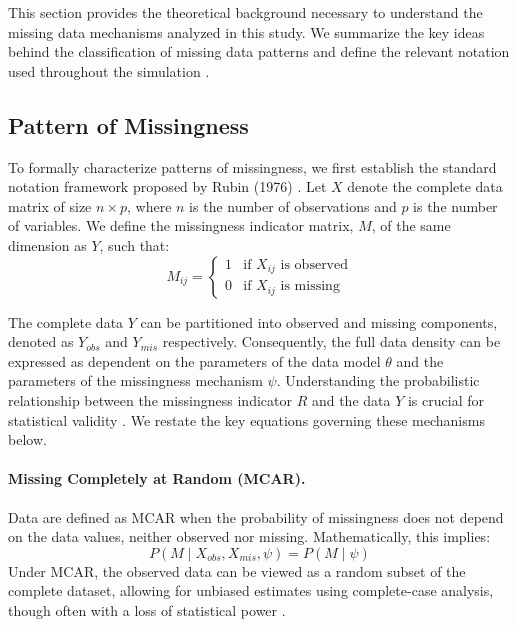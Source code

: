 \documentclass[11pt, a4paper]{article}
\begin{document}
This section provides the theoretical background necessary to understand the missing data mechanisms analyzed in this study.
We summarize the key ideas behind the classification of missing data patterns and define the relevant notation used throughout the simulation \citep{LittleRubin2019}.

\subsection{Pattern of Missingness}
To formally characterize patterns of missingness, we first establish the standard notation framework proposed by Rubin (1976) \citep{LittleRubin2019}.
Let $X$ denote the complete data matrix of size $n \times p$, where $n$ is the number of observations and $p$ is the number of variables.
We define the missingness indicator matrix, $M$, of the same dimension as $Y$, such that:
\begin{equation}
M_{ij} = \begin{cases} 
1 & \text{if } X_{ij} \text{ is observed} \\
0 & \text{if } X_{ij} \text{ is missing}
\end{cases}
\end{equation}

The complete data $Y$ can be partitioned into observed and missing components, denoted as $Y_{obs}$ and $Y_{mis}$ respectively.
Consequently, the full data density can be expressed as dependent on the parameters of the data model $\theta$ and the parameters of the missingness mechanism $\psi$.
Understanding the probabilistic relationship between the missingness indicator $R$ and the data $Y$ is crucial for statistical validity \citep{LittleRubin2019}.
We restate the key equations governing these mechanisms below.

\paragraph{Missing Completely at Random (MCAR).}
Data are defined as MCAR when the probability of missingness does not depend on the data values, neither observed nor missing.
Mathematically, this implies:
\begin{equation}
P(M \mid X_{obs}, X_{mis}, \psi) = P(M \mid \psi)
\end{equation}
Under MCAR, the observed data can be viewed as a random subset of the complete dataset, allowing for unbiased estimates using complete-case analysis, though often with a loss of statistical power \citep{LittleRubin2019}.
\end{document}
